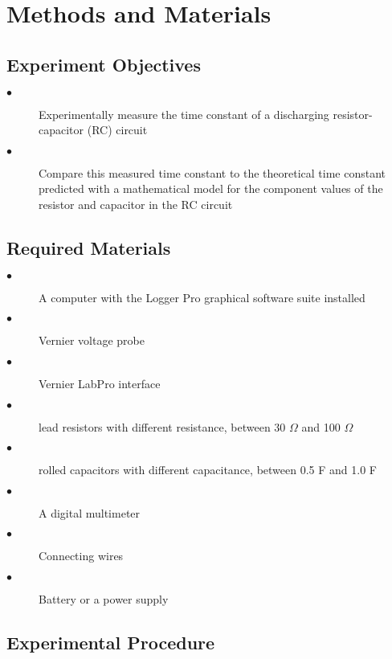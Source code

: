 \documentclass[12pt]{article}
\begin{document}
\pagebreak
{}
\section*{\centering Methods and Materials}

\subsection*{Experiment Objectives}
\begin{description}
\item[$\bullet$] \noindent Experimentally measure the time constant of a discharging resistor-capacitor (RC) circuit
\item[$\bullet$] \noindent Compare this measured time constant to the theoretical time constant predicted with a mathematical model for the component values of the resistor and capacitor in the RC circuit
\end{description}

\subsection*{Required Materials}


\begin{description}
    \item[$\bullet$]
  \noindent A computer with the Logger Pro graphical software suite installed
  \item[$\bullet$]
    \noindent Vernier voltage probe
      \item[$\bullet$]
    \noindent Vernier LabPro interface
  \item[$\bullet$]
   lead resistors with different resistance, between 30 $\Omega$ and 100 $\Omega$
    \item[$\bullet$]
   rolled capacitors with different capacitance, between 0.5 F and 1.0 F 
      \item[$\bullet$]
  \noindent A digital multimeter	
        \item[$\bullet$]
  \noindent Connecting wires
  \item[$\bullet$]
  \noindent Battery or a power supply 
\end{description}

\subsection*{Experimental Procedure}
\end{document}
